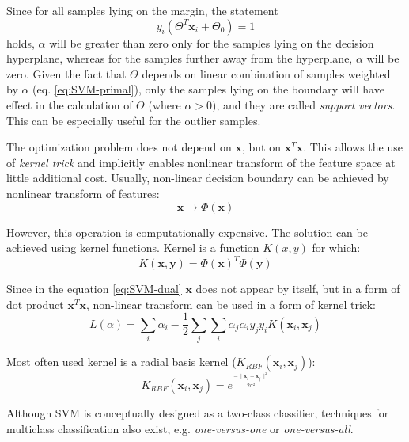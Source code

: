 Since for all samples lying on the margin, the statement  
\begin{equation}
y_i \left( \Theta^T\mathbf{x}_i + \Theta_0  \right) = 1
\end{equation}
\noindent holds, $\alpha$ will be greater than zero only for the samples lying on the decision hyperplane, whereas for the samples further away from the hyperplane, $\alpha$ will be zero. Given the fact that $\Theta$ depends on linear combination of samples weighted by $\alpha$ (eq. \ref{eq:SVM-primal}), only the samples lying on the boundary will have effect in the calculation of $\Theta$ (where $\alpha > 0$), and they are called \emph{support vectors}. This can be especially useful for the outlier samples.

The optimization problem does not depend on $\mathbf{x}$, but on $\mathbf{x}^T\mathbf{x}$. This allows the use of \emph{kernel trick} and implicitly enables nonlinear transform of the feature space at little additional cost. Usually, non-linear decision boundary can be achieved by nonlinear transform of features:
\begin{equation} 
\mathbf{x} \rightarrow \Phi(\mathbf{x})
\end{equation}

However, this operation is computationally expensive. The solution can be achieved using kernel functions. Kernel is a function $K(x,y)$ for which:
\begin{equation} 
K(\mathbf{x},\mathbf{y}) = \Phi(\mathbf{x})^T  \Phi(\mathbf{y})
\end{equation}

Since in the equation \ref{eq:SVM-dual} $\mathbf{x}$ does not appear by itself, but in a form of dot product $\mathbf{x}^T\mathbf{x}$, non-linear transform can be used in a form of kernel trick:
\begin{equation} 
L(\alpha) = \sum_i \alpha_i - \frac{1}{2} \sum_j \sum_i \alpha_j \alpha_i y_j y_i K(\mathbf{x}_i, \mathbf{x}_j)
\end{equation}

Most often used kernel is a radial basis kernel ($K_{RBF}(\mathbf{x}_i,\mathbf{x}_j)$):
\begin{equation} 
K_{RBF}(\mathbf{x}_i,\mathbf{x}_j) = e^\frac{-\parallel \mathbf{x}_i - \mathbf{x}_j\parallel^2}{2\sigma^2}
\end{equation}

Although SVM is conceptually designed as a two-class classifier, techniques for multiclass classification also exist, e.g. \emph{one-versus-one} or \emph{one-versus-all}.



\

